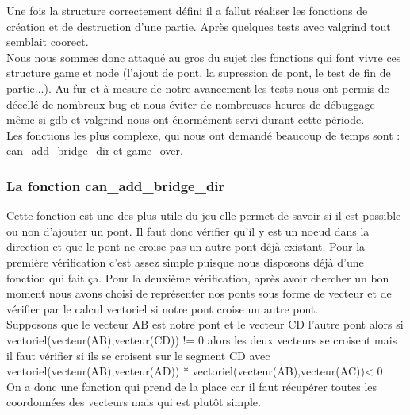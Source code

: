 \documentclass[12pt]{report}
\begin{document}
\textnormal{Une fois la structure correctement défini il a fallut réaliser les fonctions de création et de destruction d'une partie. Après quelques tests avec valgrind tout semblait coorect.\\ Nous nous sommes donc attaqué au gros du sujet :les fonctions qui font vivre ces structure game et node (l'ajout de pont, la supression de pont, le test de fin de partie...). Au fur et à mesure de notre avancement les tests nous ont permis de décellé de nombreux bug et nous éviter de nombreuses heures de débuggage même si gdb et valgrind nous ont énormément servi durant cette période.\\ Les fonctions les plus complexe, qui nous ont demandé beaucoup de temps sont : can\_add\_bridge\_dir et game\_over.}

\subsubsection{La fonction can\_add\_bridge\_dir}
\textnormal{Cette fonction est une des plus utile du jeu elle permet de savoir si il est possible ou non d'ajouter un pont. Il faut donc vérifier qu'il y est un noeud dans la direction et que le pont ne croise pas un autre pont déjà existant. Pour la première vérification c'est assez simple puisque nous disposons déjà d'une fonction qui fait ça. Pour la deuxième vérification, après avoir chercher un bon moment nous avons choisi de représenter nos ponts sous forme de vecteur et de vérifier par le calcul vectoriel si notre pont croise un autre pont. \\ Supposons que le vecteur AB est notre pont et le vecteur CD l'autre pont alors si vectoriel(vecteur(AB),vecteur(CD)) != 0 alors les deux vecteurs se croisent mais il faut vérifier si ils se croisent sur le segment CD avec vectoriel(vecteur(AB),vecteur(AD)) * vectoriel(vecteur(AB),vecteur(AC))< 0\\On a donc une fonction qui prend de la place car il faut récupérer toutes les coordonnées des vecteurs mais qui est plutôt simple.}
\end{document}
